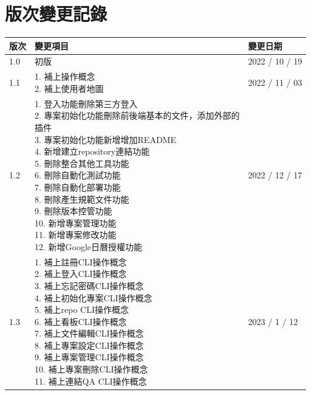 \documentclass{report}
\begin{document}
\section*{版次變更記錄}
\begin{tabularx}{\textwidth}{ 
  |p{}%
  |p{}%
  |p{}|%
}
  \hline
  版次 & 變更項目 & 變更日期 \\
  \hline
  1.0 & 初版 & 2022 / 10 / 19 \\
  \hline
  1.1 & 
  \makecell[l]{
    1. 補上操作概念 \\
    2. 補上使用者地圖 \\
  }
  & 2022 / 11 / 03 \\
  \hline
  1.2 & 
  \makecell[l]{
    1. 登入功能刪除第三方登入 \\
    2. 專案初始化功能刪除前後端基本的文件，添加外部的\\
    插件 \\
    3. 專案初始化功能新增增加README \\
    4. 新增建立repository連結功能 \\
    5. 刪除整合其他工具功能 \\
    6. 刪除自動化測試功能 \\
    7. 刪除自動化部署功能 \\
    8. 刪除產生規範文件功能 \\
    9. 刪除版本控管功能 \\ 
    10. 新增專案管理功能 \\
    11. 新增專案修改功能 \\
    12. 新增Google日曆授權功能 \\
  }
  & 2022 / 12 / 17 \\
  \hline
  1.3 & 
  \makecell[l]{
    1. 補上註冊CLI操作概念 \\
    2. 補上登入CLI操作概念\\
    3. 補上忘記密碼CLI操作概念\\
    4. 補上初始化專案CLI操作概念\\
    5. 補上repo CLI操作概念\\
    6. 補上看板CLI操作概念\\
    7. 補上文件編輯CLI操作概念\\
    8. 補上專案設定CLI操作概念\\
    9. 補上專案管理CLI操作概念 \\
    10. 補上專案刪除CLI操作概念 \\
    11. 補上連結QA CLI操作概念 \\
  }
  & 2023 / 1 / 12 \\
  \hline
\end{tabularx}
\end{document}
